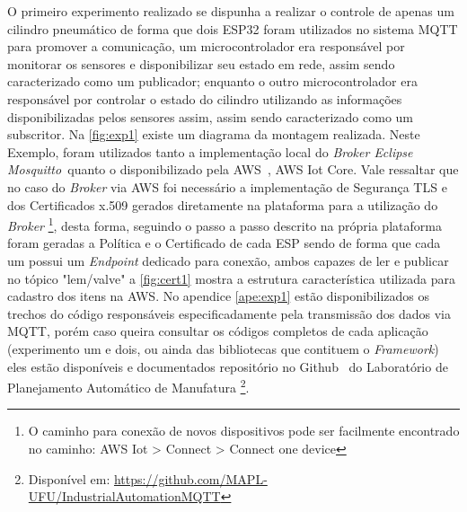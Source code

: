O primeiro experimento realizado se dispunha a realizar o controle de apenas um cilindro pneumático de forma que dois
ESP32 foram utilizados no sistema \ac{MQTT} para promover a comunicação, um microcontrolador era responsável por monitorar 
os sensores e disponibilizar seu estado em rede, assim sendo caracterizado como um publicador; enquanto o outro 
microcontrolador era responsável por controlar o estado do cilindro utilizando as informações disponibilizadas pelos 
sensores assim, assim sendo caracterizado como um subscritor. Na \autoref{fig:exp1} existe um diagrama da montagem 
realizada. Neste Exemplo, foram utilizados tanto a implementação local do \textit{Broker Eclipse Mosquitto\textregistered~}quanto 
o disponibilizado pela AWS\textregistered~, AWS Iot Core. Vale ressaltar que no caso do \textit{Broker} via AWS foi necessário a 
implementação de Segurança \ac{TLS} e dos Certificados x.509 gerados diretamente na plataforma para a utilização do \textit{Broker}
\footnote{O caminho para conexão de novos dispositivos pode ser facilmente encontrado no caminho: 
AWS Iot > Connect > Connect one device}, 
desta forma, seguindo o passo a passo descrito na própria plataforma foram geradas a Política e o Certificado de cada ESP
sendo de forma que cada um possui um \textit{Endpoint} dedicado para conexão, ambos capazes de ler e publicar no tópico "lem/valve"
a \autoref{fig:cert1} mostra a estrutura característica utilizada para cadastro dos itens na AWS. No apendice \autoref{ape:exp1} 
estão disponibilizados os trechos do código responsáveis especificadamente pela transmissão dos dados via \ac{MQTT}, porém
caso queira consultar os códigos completos de cada aplicação (experimento um e dois, ou ainda das bibliotecas que contituem o \textit{Framework})
eles estão disponíveis e documentados repositório no Github\textregistered~ do Laboratório de Planejamento Automático de Manufatura \footnote{
    Disponível em: \url{https://github.com/MAPL-UFU/IndustrialAutomationMQTT}}.

